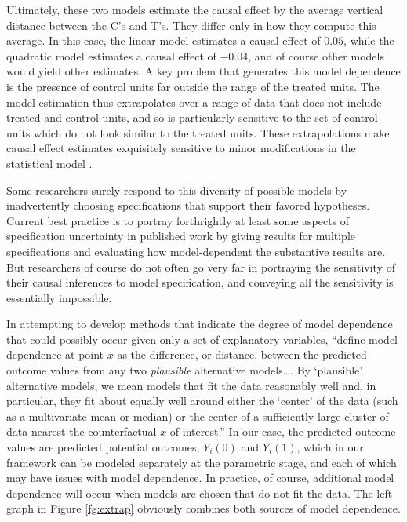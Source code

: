 \documentclass[11pt,titlepage]{article}
\begin{document}
Ultimately, these two models estimate the causal effect by the average
vertical distance between the C's and T's.  They differ only in how
they compute this average.  In this case, the linear model estimates a
causal effect of $0.05$, while the quadratic model estimates a causal
effect of $-0.04$, and of course other models would yield other
estimates.  A key problem that generates this model dependence is the
presence of control units far outside the range of the treated units.
The model estimation thus extrapolates over a range of data that does
not include treated and control units, and so is particularly
sensitive to the set of control units which do not look similar to the
treated units.  These extrapolations make causal effect estimates
exquisitely sensitive to minor modifications in the statistical model
\citep{KinZen06b}.

Some researchers surely respond to this diversity of possible models
by inadvertently choosing specifications that support their favored
hypotheses.  Current best practice is to portray forthrightly at least
some aspects of specification uncertainty in published work by giving
results for multiple specifications and evaluating how model-dependent
the substantive results are.  But researchers of course do not often
go very far in portraying the sensitivity of their causal inferences
to model specification, and conveying all the sensitivity is
essentially impossible.

In attempting to develop methods that indicate the degree of model
dependence that could possibly occur given only a set of explanatory
variables, \citet{KinZen06a} ``define model dependence at point $x$ as
the difference, or distance, between the predicted outcome values from
any two \emph{plausible} alternative models\dots.  By `plausible'
alternative models, we mean models that fit the data reasonably well
and, in particular, they fit about equally well around either the
`center' of the data (such as a multivariate mean or median) or the
center of a sufficiently large cluster of data nearest the
counterfactual $x$ of interest.''  In our case, the predicted outcome
values are predicted potential outcomes, $Y_i(0)$ and $Y_i(1)$, which
in our framework can be modeled separately at the parametric stage,
and each of which may have issues with model dependence.  In practice,
of course, additional model dependence will occur when models are
chosen that do not fit the data.  The left graph in Figure
\ref{fg:extrap} obviously combines both sources of model dependence.
\end{document}
